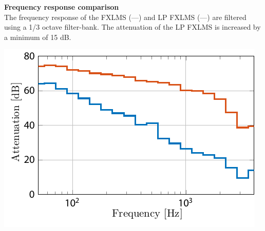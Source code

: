 \begin{minipage}{.43\columnwidth}
\textbf{Frequency response comparison}\\
The frequency response of the FXLMS (\textcolor{MATLABblue}{---}) and LP FXLMS (\textcolor{MATLABred}{---}) are filtered using a 1/3 octave filter-bank.
The attenuation of the LP FXLMS is increased by a minimum of 15 dB.


\end{minipage}%
\hspace{4mm}
\begin{minipage}{0.5\columnwidth}
	\includegraphics[width=\textwidth]{figures/ComparedConusmerHPOur.pdf}
\end{minipage}
